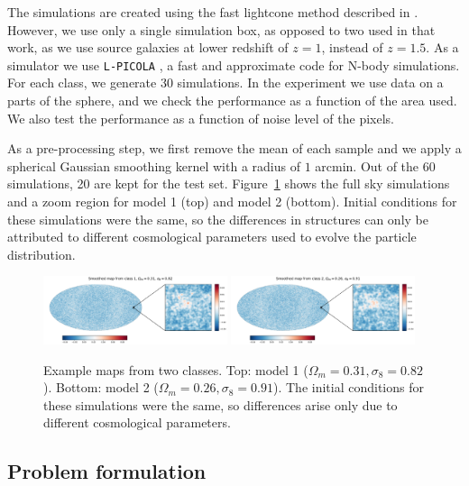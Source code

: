 \documentclass[final,twocolumn,3p,times,authoryear]{elsarticle}
\newcommand{\nati}[1]{{\color[rgb]{.1,.6,.1}{#1}}}
\newcommand{\figref}[1]{Figure~\ref{fig:#1}}
\newcommand{\1}{\b{1}}              %
\newcommand{\0}{\b{0}}              %
\newcommand{\pkg}[1]{\texttt{#1}}
\begin{document}
The simulations are created using the fast lightcone method described in \citep{sgier2018fastgeneration}.
However, we use only a single simulation box, as opposed to two used in that work, as we use source galaxies at lower redshift of $z=1$, instead of $z=1.5$.
As a simulator we use \pkg{L-PICOLA} \citep{howlett2015lpicola}, a fast and approximate code for N-body simulations.
For each class, we generate 30 simulations.
In the experiment we use data on a parts of the sphere, and we check the performance as a function of the area used.
We also test the performance as a function of noise level of the pixels.

As a pre-processing step, we first remove the mean of each sample and we apply a spherical Gaussian smoothing kernel with a radius of $1$ arcmin.
Out of the 60 simulations, 20 are kept for the test set.
\figref{map_sample} shows the full sky simulations and a zoom region for model 1 (top) and model 2 (bottom).
Initial conditions for these simulations were the same, so the differences in structures can only be attributed to different cosmological parameters used to evolve the particle distribution.

\begin{figure}[!ht]
\centering
\includegraphics[width=0.48\textwidth]{figures/smooth_map_class_1.pdf}
\includegraphics[width=0.48\textwidth]{figures/smooth_map_class_2.pdf}
\caption{Example maps from two classes. Top: model 1 ($\Omega_m=0.31, \sigma_8=0.82$). Bottom: model 2 ($\Omega_m=0.26, \sigma_8=0.91$).
The initial conditions for these simulations were the same, so differences arise only due to different cosmological parameters. \nati{Tomek: Is this correct?}}
\label{fig:map_sample}
\end{figure}

\subsection{Problem formulation}
\end{document}
